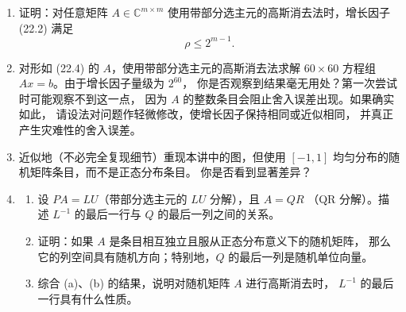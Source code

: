 \documentclass[UTF8,fontset=none,12pt]{ctexart}
\begin{document}
\begin{enumerate}[label=\textbf{22.\arabic*.},leftmargin=*]
    \item 证明：对任意矩阵 $A\in\mathbb{C}^{m\times m}$ 使用带部分选主元的高斯消去法时，增长因子 (22.2) 满足
    \[
    \rho\le 2^{m-1}.
    \]

    \item 对形如 (22.4) 的 $A$，使用带部分选主元的高斯消去法求解
    $60\times60$ 方程组 $Ax=b$。由于增长因子量级为 $2^{60}$，
    你是否观察到结果毫无用处？第一次尝试时可能观察不到这一点，
    因为 $A$ 的整数条目会阻止舍入误差出现。如果确实如此，
    请设法对问题作轻微修改，使增长因子保持相同或近似相同，
    并真正产生灾难性的舍入误差。

    \item 近似地（不必完全复现细节）重现本讲中的图，但使用
    $[-1,1]$ 均匀分布的随机矩阵条目，而不是正态分布条目。
    你是否看到显著差异？

    \item
    \begin{enumerate}[label=(\alph*),leftmargin=2em]
        \item 设 $PA=LU$（带部分选主元的 $LU$ 分解），且 $A=QR$
        （QR 分解）。描述 $L^{-1}$ 的最后一行与 $Q$ 的最后一列之间的关系。
        \item 证明：如果 $A$ 是条目相互独立且服从正态分布意义下的随机矩阵，
        那么它的列空间具有随机方向；特别地，$Q$ 的最后一列是随机单位向量。
        \item 综合 (a)、(b) 的结果，说明对随机矩阵 $A$ 进行高斯消去时，
        $L^{-1}$ 的最后一行具有什么性质。
    \end{enumerate}
\end{enumerate}
\end{document}
